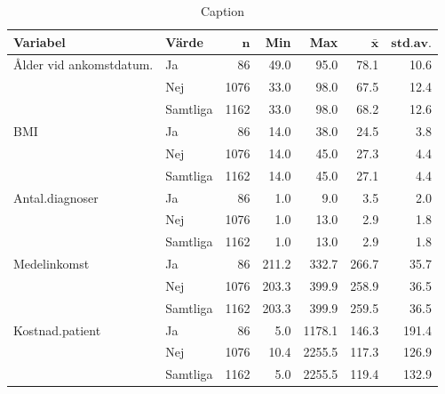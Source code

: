 \begin{table}[htbp]
\centering
\caption{Caption}
\label{tabl:alder}    
{\footnotesize
\begin{tabular}{llrrrrr}
 \textbf{Variabel} & \textbf{Värde} & $\mathbf{n}$ & \textbf{Min} & \textbf{Max} & $\mathbf{\bar{x}}$ & $\mathbf{std.av.}$ \\ 
  \hline
Ålder vid ankomstdatum. & Ja &   86 &  49.0 &   95.0 &  78.1 &  10.6 \\ 
   & Nej & 1076 &  33.0 &   98.0 &  67.5 &  12.4 \\ 
   \hline
 & Samtliga & 1162 &  33.0 &   98.0 &  68.2 &  12.6 \\ 
   \hline
BMI & Ja &   86 &  14.0 &   38.0 &  24.5 &   3.8 \\ 
   & Nej & 1076 &  14.0 &   45.0 &  27.3 &   4.4 \\ 
   \hline
 & Samtliga & 1162 &  14.0 &   45.0 &  27.1 &   4.4 \\ 
   \hline
Antal.diagnoser & Ja &   86 &   1.0 &    9.0 &   3.5 &   2.0 \\ 
   & Nej & 1076 &   1.0 &   13.0 &   2.9 &   1.8 \\ 
   \hline
 & Samtliga & 1162 &   1.0 &   13.0 &   2.9 &   1.8 \\ 
   \hline
Medelinkomst & Ja &   86 & 211.2 &  332.7 & 266.7 &  35.7 \\ 
   & Nej & 1076 & 203.3 &  399.9 & 258.9 &  36.5 \\ 
   \hline
 & Samtliga & 1162 & 203.3 &  399.9 & 259.5 &  36.5 \\ 
   \hline
Kostnad.patient & Ja &   86 &   5.0 & 1178.1 & 146.3 & 191.4 \\ 
   & Nej & 1076 &  10.4 & 2255.5 & 117.3 & 126.9 \\ 
   \hline
 & Samtliga & 1162 &   5.0 & 2255.5 & 119.4 & 132.9 \\ 
   \hline
\end{tabular}
}
\end{table}

